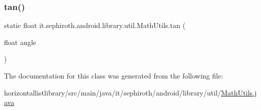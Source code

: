 \mbox{\label{classit_1_1sephiroth_1_1android_1_1library_1_1util_1_1_math_utils_af21fc1258ec2cda8a93ef56f7a00dac7}} 
\subsubsection{\texorpdfstring{tan()}{tan()}}
{\footnotesize\ttfamily static float it.\+sephiroth.\+android.\+library.\+util.\+Math\+Utils.\+tan (\begin{DoxyParamCaption}\item[{float}]{angle }\end{DoxyParamCaption})\hspace{0.3cm}{\ttfamily [static]}}



The documentation for this class was generated from the following file\+:\begin{DoxyCompactItemize}
\item 
horizontallistlibrary/src/main/java/it/sephiroth/android/library/util/\hyperlink{_math_utils_8java}{Math\+Utils.\+java}\end{DoxyCompactItemize}
